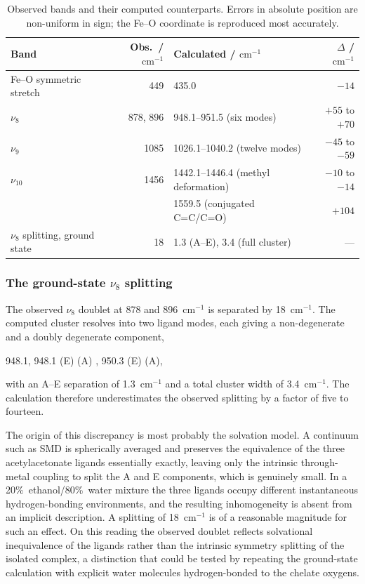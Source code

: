 \documentclass[11pt,a4paper]{article}
\newcommand{\wn}{\ensuremath{\mathrm{cm^{-1}}}}
\begin{document}
\begin{table}[htbp]
\centering
\caption{Observed bands and their computed counterparts. Errors in absolute
position are non-uniform in sign; the Fe--O coordinate is reproduced most
accurately.}
\label{tab:exp}
\begin{tabular}{l r l r}
\toprule
Band & Obs.\ / \wn{} & Calculated / \wn{} & $\Delta$ / \wn{} \\
\midrule
Fe--O symmetric stretch & 449  & 435.0                    & $-14$ \\
$\nu_8$                 & 878, 896 & 948.1--951.5 (six modes) & $+55$ to $+70$ \\
$\nu_9$                 & 1085 & 1026.1--1040.2 (twelve modes) & $-45$ to $-59$ \\
$\nu_{10}$              & 1456 & 1442.1--1446.4 (methyl deformation) & $-10$ to $-14$ \\
                        &      & 1559.5 (conjugated C=C/C=O)         & $+104$ \\
\midrule
$\nu_8$ splitting, ground state & 18 & 1.3 (A--E), 3.4 (full cluster) & --- \\
\bottomrule
\end{tabular}
\end{table}

\subsubsection*{The ground-state $\nu_8$ splitting}

The observed $\nu_8$ doublet at 878 and 896~\wn{} is separated by 18~\wn{}.
The computed cluster resolves into two ligand modes, each giving a
non-degenerate and a doubly degenerate component,
\begin{center}
948.1, 948.1 (E)  (A) \quad{}, 950.3 (E)  (A),
\end{center}
with an A--E separation of 1.3~\wn{} and a total cluster width of 3.4~\wn{}.
The calculation therefore underestimates the observed splitting by a factor of
five to fourteen.

The origin of this discrepancy is most probably the solvation model. A
continuum such as SMD is spherically averaged and preserves the equivalence of
the three acetylacetonate ligands essentially exactly, leaving only the
intrinsic through-metal coupling to split the A and E components, which is
genuinely small. In a 20\%~ethanol/80\%~water mixture the three ligands occupy
different instantaneous hydrogen-bonding environments, and the resulting
inhomogeneity is absent from an implicit description. A splitting of 18~\wn{}
is of a reasonable magnitude for such an effect. On this reading the observed
doublet reflects solvational inequivalence of the ligands rather than the
intrinsic symmetry splitting of the isolated complex, a distinction that could
be tested by repeating the ground-state calculation with explicit water
molecules hydrogen-bonded to the chelate oxygens.
\end{document}
